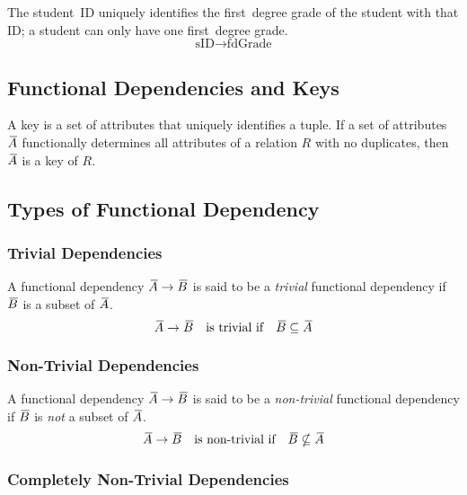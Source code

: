 The student~ID uniquely identifies the first~degree grade of the student with that ID; a student can only have one first~degree grade.
\begin{equation*}
  \text{sID} \rightarrow \text{fdGrade}
\end{equation*}

\subsection{Functional Dependencies and Keys}

A key is a set of attributes that uniquely identifies a tuple.
If a set of attributes \( {}\mkern3mu\overline{\mkern-3muA} \) functionally determines all attributes of a relation \( R \) with no duplicates, then \( {}\mkern3mu\overline{\mkern-3muA} \) is a key of \( R \)\@.

\subsection{Types of Functional Dependency}

\subsubsection{Trivial Dependencies}

A functional dependency \( {}\mkern3mu\overline{\mkern-3muA} \rightarrow {}\mkern3mu\overline{\mkern-3muB} \) is said to be a \emph{trivial} functional dependency if \( {}\mkern3mu\overline{\mkern-3muB} \) is a subset of \( {}\mkern3mu\overline{\mkern-3muA} \).
\begin{equation*}
  {}\mkern3mu\overline{\mkern-3muA} \rightarrow {}\mkern3mu\overline{\mkern-3muB} \quad \text{is trivial if} \quad {}\mkern3mu\overline{\mkern-3muB} \subseteq {}\mkern3mu\overline{\mkern-3muA}
\end{equation*}

\subsubsection{Non-Trivial Dependencies}

A functional dependency \( {}\mkern3mu\overline{\mkern-3muA} \rightarrow {}\mkern3mu\overline{\mkern-3muB} \) is said to be a \emph{non-trivial} functional dependency if \( {}\mkern3mu\overline{\mkern-3muB} \) is \emph{not} a subset of \( {}\mkern3mu\overline{\mkern-3muA} \)\@.
\begin{equation*}
  {}\mkern3mu\overline{\mkern-3muA} \rightarrow {}\mkern3mu\overline{\mkern-3muB} \quad \text{is non-trivial if} \quad {}\mkern3mu\overline{\mkern-3muB} \nsubseteq {}\mkern3mu\overline{\mkern-3muA}
\end{equation*}

\subsubsection{Completely Non-Trivial Dependencies}

